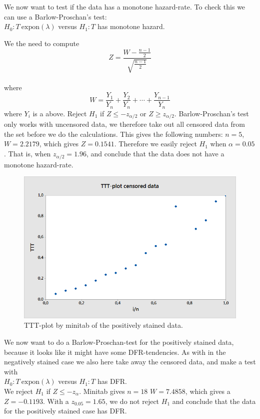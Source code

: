\documentclass[10pt, a4paper]{article}
\begin{document}
We now want to test if the data has a monotone hazard-rate. To check this we can use a Barlow-Proschan's test:\\
$H_0 : T ~ \text{expon}(\lambda) $ versus $ H_1 : T $ has monotone hazard.

We the need to compute \\
$$ Z = \frac{W-\frac{n-1}{2}}{\sqrt{\frac{n-1}{2}}} $$ \\
where $$W = \frac{Y_1}{Y_n}+\frac{Y_2}{Y_n}+\cdots+\frac{Y_{n-1}}{Y_n}$$ where $Y_i$ is a above.
Reject $ H_1 $ if $ Z \leq -z_{\alpha/2} $ or $ Z \geq z_{\alpha/2} $. Barlow-Proschan's test only works with uncensored data, we therefore take out all censored data from the set before we do the calculations. 
This gives the following numbers:
$ n=5 $, $ W =2.2179  $, which gives $ Z = 0.1541 $. Therefore we easily reject $ H_1$ when $\alpha =0.05$. That is, when $ z_{\alpha/2} = 1.96 $, and conclude that the data does not have a monotone hazard-rate.\\

\begin{center}
\begin{figure}[h!]
\centering
\includegraphics[scale=0.75]{TTT2.png}
\caption{TTT-plot by minitab of the positively stained data.}
\end{figure}
\end{center}

We now want to do a Barlow-Proschan-test for the positively stained data, because it looks like it might have some DFR-tendencies. As with in the negatively stained case we also here take away the censored data, and make a test with\\
$H_0 : T ~ \text{expon}(\lambda) $ versus $ H_1 : T $ has DFR.\\
We reject $H_1$ if $ Z\leq -z_\alpha $. Minitab gives $ n=18 $ $ W = 7.4858 $,  which gives a $Z = -0.1193 $. With a $ z_{0.05} = 1.65 $, we do not reject $H_1 $ and conclude that the data for the positively stained case has DFR.\\
     
\end{document}
